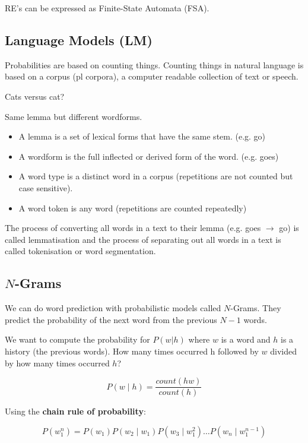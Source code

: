 RE's can be expressed as Finite-State Automata (FSA).

\subsection*{Language Models (LM)}

Probabilities are based on counting things. Counting things in natural language is based on a corpus (pl corpora), a computer readable collection of text or speech.

Cats versus cat?

Same lemma but different wordforms.

\begin{itemize}
  \item A lemma is a set of lexical forms that have the same stem. (e.g. go)
  \item A wordform is the full inflected or derived form of the word. (e.g. goes)
  \item A word type is a distinct word in a corpus (repetitions are not counted but case sensitive).
  \item A word token is any word (repetitions are counted repeatedly)
\end{itemize}

The process of converting all words in a text to their lemma (e.g. goes $\to$ go) is called lemmatisation and the process of separating out all words in a text is called tokenisation or word segmentation.

\subsection*{$N$-Grams}

We can do word prediction with probabilistic models called $N$-Grams. They predict the probability of the next word from the previous $N-1$ words.

We want to compute the probability for $P(w|h)$ where $w$ is a word and $h$ is a history (the previous words). How many times occurred h followed by $w$ divided by how many times occurred $h$?

\begin{equation}
  P(w \mid h) = \frac{count(hw)}{count(h)}
\end{equation}

Using the \textbf{chain rule of probability}:

\begin{equation}
  P(w_1^n) = P(w_1)P(w_2 \mid w_1)P(w_3 \mid w_1^2 ) \ldots P(w_n \mid w_1^{n-1})
\end{equation}

